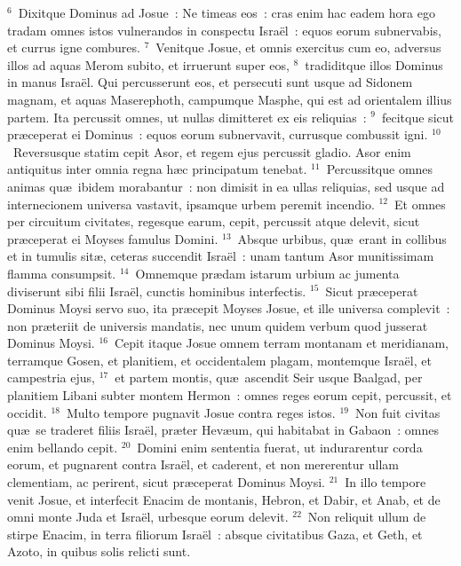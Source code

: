 ${}^{6}$~Dixitque Dominus ad Josue~: Ne timeas eos~: cras enim hac eadem hora ego tradam omnes istos vulnerandos in conspectu Isra\"el~: equos eorum subnervabis, et currus igne combures.
${}^{7}$~Venitque Josue, et omnis exercitus cum eo, adversus illos ad aquas Merom subito, et irruerunt super eos,
${}^{8}$~tradiditque illos Dominus in manus Isra\"el. Qui percusserunt eos, et persecuti sunt usque ad Sidonem magnam, et aquas Maserephoth, campumque Masphe, qui est ad orientalem illius partem. Ita percussit omnes, ut nullas dimitteret ex eis reliquias~:
${}^{9}$~fecitque sicut pr\ae ceperat ei Dominus~: equos eorum subnervavit, currusque combussit igni.
${}^{10}$~Reversusque statim cepit Asor, et regem ejus percussit gladio. Asor enim antiquitus inter omnia regna h\ae c principatum tenebat.
${}^{11}$~Percussitque omnes animas qu\ae\ ibidem morabantur~: non dimisit in ea ullas reliquias, sed usque ad internecionem universa vastavit, ipsamque urbem peremit incendio.
${}^{12}$~Et omnes per circuitum civitates, regesque earum, cepit, percussit atque delevit, sicut pr\ae ceperat ei Moyses famulus Domini.
${}^{13}$~Absque urbibus, qu\ae\ erant in collibus et in tumulis sit\ae , ceteras succendit Isra\"el~: unam tantum Asor munitissimam flamma consumpsit.
${}^{14}$~Omnemque pr\ae dam istarum urbium ac jumenta diviserunt sibi filii Isra\"el, cunctis hominibus interfectis.
${}^{15}$~Sicut pr\ae ceperat Dominus Moysi servo suo, ita pr\ae cepit Moyses Josue, et ille universa complevit~: non pr\ae teriit de universis mandatis, nec unum quidem verbum quod jusserat Dominus Moysi.
${}^{16}$~Cepit itaque Josue omnem terram montanam et meridianam, terramque Gosen, et planitiem, et occidentalem plagam, montemque Isra\"el, et campestria ejus,
${}^{17}$~et partem montis, qu\ae\ ascendit Seir usque Baalgad, per planitiem Libani subter montem Hermon~: omnes reges eorum cepit, percussit, et occidit.
${}^{18}$~Multo tempore pugnavit Josue contra reges istos.
${}^{19}$~Non fuit civitas qu\ae\ se traderet filiis Isra\"el, pr\ae ter Hev\ae um, qui habitabat in Gabaon~: omnes enim bellando cepit.
${}^{20}$~Domini enim sententia fuerat, ut indurarentur corda eorum, et pugnarent contra Isra\"el, et caderent, et non mererentur ullam clementiam, ac perirent, sicut pr\ae ceperat Dominus Moysi.
${}^{21}$~In illo tempore venit Josue, et interfecit Enacim de montanis, Hebron, et Dabir, et Anab, et de omni monte Juda et Isra\"el, urbesque eorum delevit.
${}^{22}$~Non reliquit ullum de stirpe Enacim, in terra filiorum Isra\"el~: absque civitatibus Gaza, et Geth, et Azoto, in quibus solis relicti sunt.

